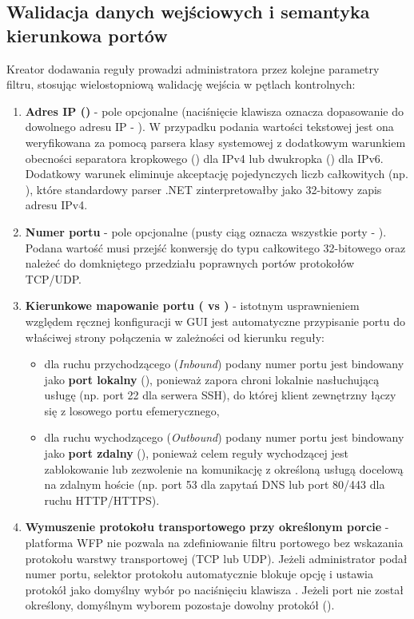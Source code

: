 \subsection{Walidacja danych wejściowych i semantyka kierunkowa portów}\label{subsec:walidacja-parametrow}

Kreator dodawania reguły prowadzi administratora przez kolejne parametry filtru, stosując wielostopniową walidację wejścia w pętlach kontrolnych:
\begin{enumerate}
    \item \textbf{Adres IP ()} - pole opcjonalne (naciśnięcie klawisza  oznacza dopasowanie do dowolnego adresu IP - ). W przypadku podania wartości tekstowej jest ona weryfikowana za pomocą parsera klasy systemowej  z dodatkowym warunkiem obecności separatora kropkowego () dla IPv4 lub dwukropka (\code{:}) dla IPv6. Dodatkowy warunek eliminuje akceptację pojedynczych liczb całkowitych (np. ), które standardowy parser .NET zinterpretowałby jako 32-bitowy zapis adresu IPv4.
    \item \textbf{Numer portu} - pole opcjonalne (pusty ciąg oznacza wszystkie porty - ). Podana wartość musi przejść konwersję do typu całkowitego 32-bitowego oraz należeć do domkniętego przedziału poprawnych portów protokołów TCP/UDP.
    \item \textbf{Kierunkowe mapowanie portu ( vs )} - istotnym usprawnieniem względem ręcznej konfiguracji w GUI jest automatyczne przypisanie portu do właściwej strony połączenia w zależności od kierunku reguły:
    \begin{itemize}
        \item dla ruchu przychodzącego (\textit{Inbound}) podany numer portu jest bindowany jako \textbf{port lokalny} (), ponieważ zapora chroni lokalnie nasłuchującą usługę (np. port 22 dla serwera SSH), do której klient zewnętrzny łączy się z losowego portu efemerycznego,
        \item dla ruchu wychodzącego (\textit{Outbound}) podany numer portu jest bindowany jako \textbf{port zdalny} (), ponieważ celem reguły wychodzącej jest zablokowanie lub zezwolenie na komunikację z określoną usługą docelową na zdalnym hoście (np. port 53 dla zapytań DNS lub port 80/443 dla ruchu HTTP/HTTPS).
    \end{itemize}
    \item \textbf{Wymuszenie protokołu transportowego przy określonym porcie} - platforma WFP nie pozwala na zdefiniowanie filtru portowego bez wskazania protokołu warstwy transportowej (TCP lub UDP). Jeżeli administrator podał numer portu, selektor protokołu automatycznie blokuje opcję  i ustawia protokół  jako domyślny wybór po naciśnięciu klawisza . Jeżeli port nie został określony, domyślnym wyborem pozostaje dowolny protokół ().
\end{enumerate}

